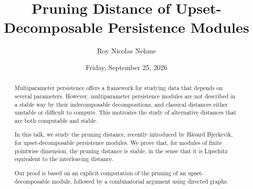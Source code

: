 \documentclass{UAmathtalk}
\author{Roy Nicolas Nehme}
\title{Pruning Distance of Upset-Decomposable Persistence Modules}
\date{Friday, September 25, 2026}
\begin{document}
\maketitle
\renewcommand*{\abstractsize}{\fontsize{13.5}{16.2}\selectfont}
\begin{abstract}
{Multiparameter persistence offers a framework for studying data that depends on several parameters. However, multiparameter persistence modules are not described in a stable way by their indecomposable decompositions, and classical distances either unstable or difficult to compute. This motivates the study of alternative distances that are both computable and stable.

In this talk, we study the pruning distance, recently introduced by Håvard Bjerkevik, for upset-decomposable persistence modules. We prove that, for modules of finite pointwise dimension, the pruning distance is stable, in the sense that it is Lipschitz equivalent to the interleaving distance.

Our proof is based on an explicit computation of the pruning of an upset-decomposable module, followed by a combinatorial argument using directed graphs.}
\end{abstract}
\end{document}
